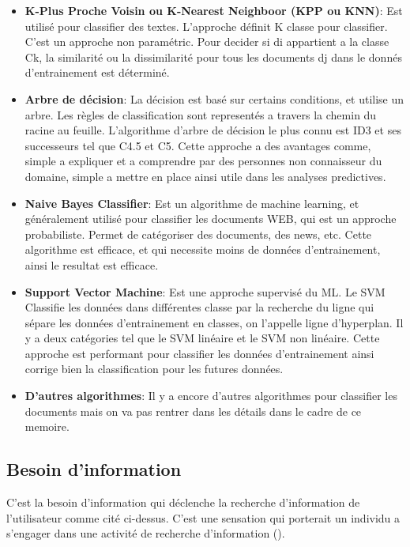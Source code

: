 \begin{itemize}
    \item \textbf{K-Plus Proche Voisin ou K-Nearest Neighboor (KPP ou KNN)}: Est utilisé pour classifier des textes. L'approche définit K classe pour classifier. C'est un approche non paramétric. Pour decider si di appartient a la classe Ck, la similarité ou la dissimilarité pour tous les documents dj dans le donnés d'entrainement est déterminé.
    \item \textbf{Arbre de décision}: La décision est basé sur certains conditions, et utilise un arbre. Les règles de classification sont representés a travers la chemin du racine au feuille. L'algorithme d'arbre de décision le plus connu est ID3 et ses successeurs tel que C4.5 et C5. Cette approche a des avantages comme, simple a expliquer et a comprendre par des personnes non connaisseur du domaine, simple a mettre en place ainsi utile dans les analyses predictives.
    \item \textbf{Naive Bayes Classifier}: Est un algorithme de machine learning, et généralement utilisé pour classifier les documents WEB, qui est un approche probabiliste. Permet de catégoriser des documents, des news, etc. Cette algorithme est efficace, et qui necessite moins de données d'entrainement, ainsi le resultat est efficace.
    \item \textbf{Support Vector Machine}: Est une approche supervisé du ML. Le SVM Classifie les données dans différentes classe par la recherche du ligne qui sépare les données d'entrainement en classes, on l'appelle ligne d'hyperplan. Il y a deux catégories tel que le SVM linéaire et le SVM non linéaire. Cette approche est performant pour classifier les données d'entrainement ainsi corrige bien la classification pour les futures données.
    \item \textbf{D'autres algorithmes}: Il y a encore d'autres algorithmes pour classifier les documents mais on va pas rentrer dans les détails dans le cadre de ce memoire.
\end{itemize}

\subsection{Besoin d'information}

\begin{definition}
    C'est la besoin d'information qui déclenche la recherche d'information de l'utilisateur comme cité ci-dessus. C'est une sensation qui porterait un individu a s'engager dans une activité de recherche d'information (\cite{thesaurus-ir-web}).
\end{definition}

